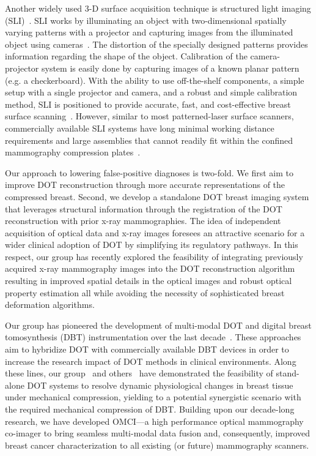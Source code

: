 Another widely used 3-D surface acquisition technique is structured light imaging (SLI)~\cite{Yang2020, Zhang2018}. SLI works by illuminating an object with two-dimensional spatially varying patterns with a projector and capturing images from the illuminated object using cameras~\cite{Geng2011}. The distortion of the specially designed patterns provides information regarding the shape of the object. Calibration of the camera-projector system is easily done by capturing images of a known planar pattern (e.g. a checkerboard). With the ability to use off-the-shelf components, a simple setup with a single projector and camera, and a robust and simple calibration method, SLI is positioned to provide accurate, fast, and cost-effective breast surface scanning~\cite{Yang2020}. However, similar to most patterned-laser surface scanners, commercially available SLI systems have long minimal working distance requirements and large assemblies that cannot readily fit within the confined mammography compression plates~\cite{Zhang2018, Rodriguez2017}.

Our approach to lowering false-positive diagnoses is two-fold. We first aim to improve DOT reconstruction through more accurate representations of the compressed breast. Second, we develop a standalone DOT breast imaging system that leverages structural information through the registration of the DOT reconstruction with prior x-ray mammographies. The idea of independent acquisition of optical data and x-ray images foresees an attractive scenario for a wider clinical adoption of DOT by simplifying its regulatory pathways. In this respect, our group has recently explored the feasibility of integrating previously acquired x-ray mammography images into the DOT reconstruction algorithm~\cite{Deng2015} resulting in improved spatial details in the optical images and robust optical property estimation all while avoiding the necessity of sophisticated breast deformation algorithms\cite{Azar2007}.

Our group has pioneered the development of multi-modal DOT and digital breast tomosynthesis (DBT) instrumentation over the last decade~\cite{Fang2009,Zimmermann2017}. These approaches aim to hybridize DOT with commercially available DBT devices in order to increase the research impact of DOT methods in clinical environments. Along these lines, our group~\cite{Carp2006,Carp2008,Carp2013} and others~\cite{Wang2008,Fournier2009,Alabdi2011} have demonstrated the feasibility of stand-alone DOT systems to resolve dynamic physiological changes in breast tissue under mechanical compression, yielding to a potential synergistic scenario with the required mechanical compression of DBT. Building upon our decade-long research, we have developed OMCI---a high performance optical mammography co-imager to bring seamless multi-modal data fusion and, consequently, improved breast cancer characterization to all existing (or future) mammography scanners. 

